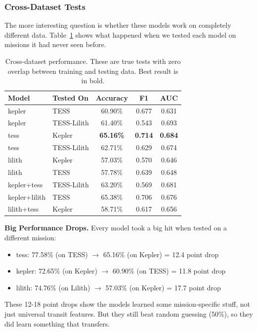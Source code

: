 \documentclass[letterpaper]{article} %
\begin{document}
\subsubsection{Cross-Dataset Tests}

The more interesting question is whether these models work on completely different data. Table~\ref{tab:cross_dataset} shows what happened when we tested each model on missions it had never seen before.

\begin{table}[H]
\centering
\begin{tabular}{llccc}
\hline
\textbf{Model} & \textbf{Tested On} & \textbf{Accuracy} & \textbf{F1} & \textbf{AUC} \\
\hline
kepler & TESS & 60.90\% & 0.677 & 0.631 \\
kepler & TESS-Lilith & 61.40\% & 0.543 & 0.693 \\
\hline
tess & Kepler & \textbf{65.16\%} & \textbf{0.714} & \textbf{0.684} \\
tess & TESS-Lilith & 62.71\% & 0.629 & 0.674 \\
\hline
lilith & Kepler & 57.03\% & 0.570 & 0.646 \\
lilith & TESS & 57.78\% & 0.639 & 0.648 \\
\hline
kepler+tess & TESS-Lilith & 63.20\% & 0.569 & 0.681 \\
kepler+lilith & TESS & 65.38\% & 0.706 & 0.676 \\
lilith+tess & Kepler & 58.71\% & 0.617 & 0.656 \\
\hline
\end{tabular}
\caption{Cross-dataset performance. These are true tests with zero overlap between training and testing data. Best result is in bold.}
\label{tab:cross_dataset}
\end{table}

\textbf{Big Performance Drops.} Every model took a big hit when tested on a different mission:

\begin{itemize}
    \item tess: 77.58\% (on TESS) $\rightarrow$ 65.16\% (on Kepler) = 12.4 point drop
    \item kepler: 72.65\% (on Kepler) $\rightarrow$ 60.90\% (on TESS) = 11.8 point drop
    \item lilith: 74.76\% (on Lilith) $\rightarrow$ 57.03\% (on Kepler) = 17.7 point drop
\end{itemize}

These 12-18 point drops show the models learned some mission-specific stuff, not just universal transit features. But they still beat random guessing (50\%), so they did learn something that transfers.
\end{document}
